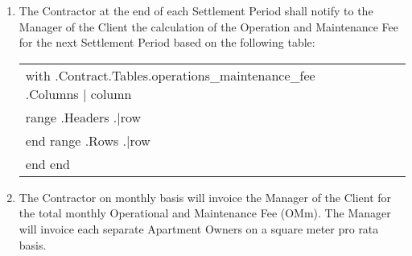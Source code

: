 \begin{enumerate}[label=\arabic*.]
	\item The Contractor at the end of each Settlement Period shall notify to the Manager of the Client the calculation of the Operation and Maintenance Fee for the next Settlement Period based on the following table:


\begin{center}
\begin{tabu}{|X|X|X|X|X|X|} \tabucline{}
{{with .Contract.Tables.operations_maintenance_fee}} %
	{{.Columns | column}} \\\tabucline{}
	{{range .Headers}} {{.|row}} \\\tabucline{} {{end}} %
	{{range .Rows}} {{.|row}} \\\tabucline{} {{end}} %
{{end}}
\end{tabu}
\end{center}

	\item The Contractor on monthly basis will invoice the Manager of the Client for the total monthly Operational and Maintenance Fee (OMm). The Manager will invoice each separate Apartment Owners on a square meter pro rata basis.

\end{enumerate}
